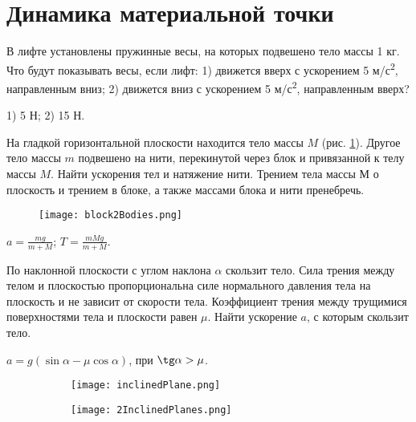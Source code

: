 \section{Динамика материальной точки}

\begin{ex} %
В лифте установлены пружинные весы, на которых подвешено тело массы 1 кг. Что будут показывать весы, если лифт: 1) движется вверх с ускорением 5 м/с\textsuperscript{2}, направленным вниз; 2) движется вниз с ускорением 5 м/с\textsuperscript{2}, направленным вверх?
\begin{ans}
1) 5 Н; 2) 15 Н.
\end{ans}
\end{ex}

\begin{ex} %
На гладкой горизонтальной плоскости находится тело массы $M$ (рис. \ref{block2Bodies}). Другое тело массы $m$ подвешено на нити, перекинутой через блок и привязанной к телу массы $M$. Найти ускорения тел и натяжение нити. Трением тела массы $М$ о плоскость и трением в блоке, а также массами блока и нити пренебречь.

\begin{figure}[h]
\centering
\texttt{[image: block2Bodies.png]}
\caption{}
\label{block2Bodies}
\end{figure}

\begin{ans}
$a = \frac{mg}{m+M}$; $T = \frac{mMg}{m+M}$.
\end{ans}
\end{ex}

\begin{ex} %
По наклонной плоскости с углом наклона $\alpha$ скользит тело. Сила трения между телом и плоскостью пропорциональна силе нормального давления тела на плоскость и не зависит от скорости тела. Коэффициент трения между трущимися поверхностями тела и плоскости равен $\mu$. Найти ускорение $a$, с которым скользит тело.
\begin{ans}
$a = g (\sin \alpha - \mu \cos \alpha)$, при $\tg \alpha > \mu$.
\end{ans}
\end{ex}

\begin{figure}[h]
\centering
\begin{subfigure}{.43\textwidth}
  \centering
  \texttt{[image: inclinedPlane.png]}
  \caption{}
  \label{inclinedPlane}
\end{subfigure}%
\begin{subfigure}{.57\textwidth}
  \centering
  \texttt{[image: 2InclinedPlanes.png]}
  \caption{}
  \label{2InclinedPlanes}
\end{subfigure}
\caption{}
\end{figure}


